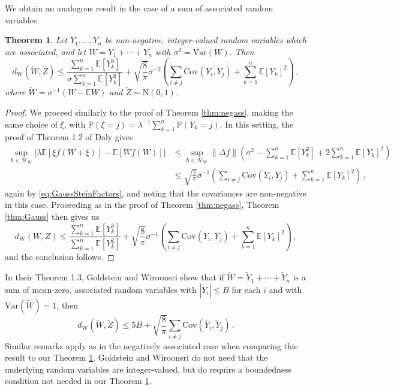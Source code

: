 \documentclass[12pt]{article}
\newtheorem{theorem}{Theorem}
\begin{document}
We obtain an analogous result in the case of a sum of associated random variables. 
\begin{theorem}\label{thm:ass}
Let $Y_1,\ldots,Y_n$ be non-negative, integer-valued random variables which are associated, and let $W=Y_1+\cdots+Y_n$ with $\sigma^2=\text{Var}(W)$. Then
\[
d_\text{W}(\widetilde{W},\widetilde{Z})\leq\frac{\sum_{k=1}^n\mathbb{E}[Y_k^3]}{\sigma\sum_{k=1}^n\mathbb{E}[Y_k^2]}
+\sqrt{\frac{8}{\pi}}\sigma^{-2}\left(\sum_{i\not=j}\text{Cov}(Y_i,Y_j)+\sum_{k=1}^n\mathbb{E}[Y_k]^2\right)\,,
\]  
where $\widetilde{W}=\sigma^{-1}(W-\mathbb{E}W)$ and $\widetilde{Z}\sim\text{N}(0,1)$.
\end{theorem} 
\begin{proof}
We proceed similarly to the proof of Theorem \ref{thm:negass}, making the same choice of $\xi$, with $\mathbb{P}(\xi=j)=\lambda^{-1}\sum_{k=1}^n\mathbb{P}(Y_k=j)$. In this setting, the proof of Theorem 1.2 of Daly \cite{daly13} gives
\begin{align*}
\sup_{h\in\mathcal{H}_{\text{W}}}\left|\lambda\mathbb{E}[\xi f(W+\xi)]-\mathbb{E}[Wf(W)]\right|&\leq\sup_{h\in\mathcal{H}_{\text{W}}}\lVert\Delta f\rVert\left(\sigma^2-\sum_{k=1}^n\mathbb{E}[Y_k^2]+2\sum_{k=1}^n\mathbb{E}[Y_k]^2\right)\\
&\leq\sqrt{\frac{2}{\pi}}\sigma^{-1}\left(\sum_{i\not=j}\text{Cov}(Y_i,Y_j)+\sum_{k=1}^n\mathbb{E}[Y_k]^2\right)\,,
\end{align*}
again by \eqref{eq:GaussSteinFactors}, and noting that the covariances are non-negative in this case. Proceeding as in the proof of Theorem \ref{thm:negass}, Theorem \ref{thm:Gauss} then gives us
\[
d_\text{W}(W,Z)\leq\frac{\sum_{k=1}^n\mathbb{E}[Y_k^3]}{\sum_{k=1}^n\mathbb{E}[Y_k^2]}
+\sqrt{\frac{8}{\pi}}\sigma^{-1}\left(\sum_{i\not=j}\text{Cov}(Y_i,Y_j)+\sum_{k=1}^n\mathbb{E}[Y_k]^2\right)\,,
\]
and the conclusion follows.
\end{proof}
In their Theorem 1.3, Goldstein and Wiroonsri \cite{goldstein18} show that if $\widetilde{W}=\widetilde{Y}_1+\cdots+\widetilde{Y}_n$ is a sum of mean-zero, associated random variables with $|\widetilde{Y}_i|\leq B$ for each $i$ and with $\text{Var}(\widetilde{W})=1$, then
\begin{equation*}
d_\text{W}(\widetilde{W},\widetilde{Z})\leq5B+\sqrt{\frac{8}{\pi}}\sum_{i\not=j}\text{Cov}(\widetilde{Y_i},\widetilde{Y}_j)\,.
\end{equation*}
Similar remarks apply as in the negatively associated case when comparing this result to our Theorem \ref{thm:ass}. Goldstein and Wiroonsri do not need that the underlying random variables are integer-valued, but do require a boundedness condition not needed in our Theorem \ref{thm:ass}.
\end{document}
